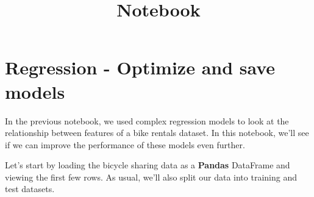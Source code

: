 \documentclass[11pt]{article}
\title{Notebook}
\begin{document}
    
    \maketitle
    
    

    
    \hypertarget{regression---optimize-and-save-models}{%
\section{Regression - Optimize and save
models}\label{regression---optimize-and-save-models}}

In the previous notebook, we used complex regression models to look at
the relationship between features of a bike rentals dataset. In this
notebook, we'll see if we can improve the performance of these models
even further.

Let's start by loading the bicycle sharing data as a \textbf{Pandas}
DataFrame and viewing the first few rows. As usual, we'll also split our
data into training and test datasets.
\end{document}
